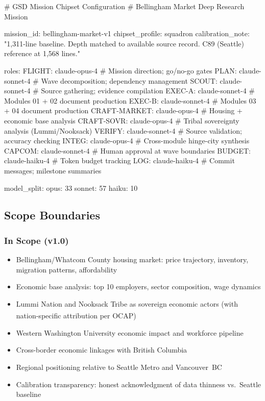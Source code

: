 \documentclass[11pt,letterpaper]{article}
\begin{document}
\begin{asciibox}
# GSD Mission Chipset Configuration
# Bellingham Market Deep Research Mission

mission_id:       bellingham-market-v1
chipset_profile:  squadron
calibration_note: "1,311-line baseline. Depth matched to available
                   source record. C89 (Seattle) reference at 1,568 lines."

roles:
  FLIGHT:         claude-opus-4    # Mission direction; go/no-go gates
  PLAN:           claude-sonnet-4  # Wave decomposition; dependency management
  SCOUT:          claude-sonnet-4  # Source gathering; evidence compilation
  EXEC-A:         claude-sonnet-4  # Modules 01 + 02 document production
  EXEC-B:         claude-sonnet-4  # Modules 03 + 04 document production
  CRAFT-MARKET:   claude-opus-4    # Housing + economic base analysis
  CRAFT-SOVR:     claude-opus-4    # Tribal sovereignty analysis (Lummi/Nooksack)
  VERIFY:         claude-sonnet-4  # Source validation; accuracy checking
  INTEG:          claude-opus-4    # Cross-module hinge-city synthesis
  CAPCOM:         claude-sonnet-4  # Human approval at wave boundaries
  BUDGET:         claude-haiku-4   # Token budget tracking
  LOG:            claude-haiku-4   # Commit messages; milestone summaries

model_split:
  opus:   33%
  sonnet: 57%
  haiku:  10%
\end{asciibox}

\subsection{Scope Boundaries}

\subsubsection{In Scope (v1.0)}

\begin{itemize}[leftmargin=*]
  \item Bellingham/Whatcom County housing market: price trajectory, inventory, migration patterns, affordability
  \item Economic base analysis: top 10 employers, sector composition, wage dynamics
  \item Lummi Nation and Nooksack Tribe as sovereign economic actors (with nation-specific attribution per OCAP\textsuperscript{\textregistered})
  \item Western Washington University economic impact and workforce pipeline
  \item Cross-border economic linkages with British Columbia
  \item Regional positioning relative to Seattle Metro and Vancouver~BC
  \item Calibration transparency: honest acknowledgment of data thinness vs.\ Seattle baseline
\end{itemize}
\end{document}
